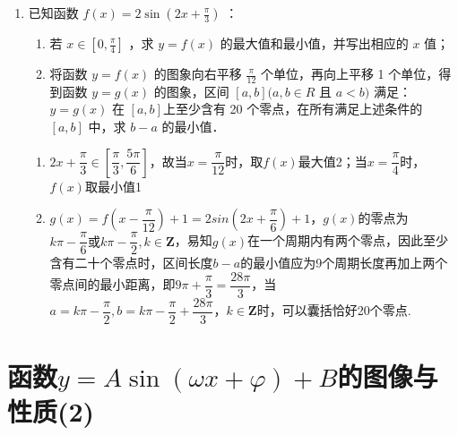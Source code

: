\begin{enumerate}
\item 已知函数 $f(x)=2 \sin \left(2 x+\frac{\pi}{3}\right)$ ：
\begin{enumerate}[(1)]
    \item 若 $x \in\left[0, \frac{\pi}{4}\right]$ ，求 $y=f(x)$ 的最大值和最小值，并写出相应的 $x$ 值；
    \item 将函数 $y=f(x)$ 的图象向右平移 $\frac{\pi}{12}$ 个单位，再向上平移 1 个单位，得到函数 $y=g(x)$ 的图象，区间 $[a, b](a, b \in R$ 且 $a<b)$ 满足：$y=g(x)$ 在 $[a, b]$上至少含有 20 个零点，在所有满足上述条件的 $[a, b]$ 中，求 $b-a$ 的最小值．
\end{enumerate}
\begin{jieda}
    \begin{enumerate}[(1)]
        \item $2x+\dfrac{\pi}{3} \in \left[\dfrac{\pi}{3}, \dfrac{5\pi}{6}\right]$，故当$x=\dfrac{\pi}{12}$时，取$f(x)$最大值2；当$x=\dfrac{\pi}{4}$时，$f(x)$取最小值1
        \item $g(x) = f\left(x - \dfrac{\pi}{12}\right) + 1 = 2sin(2x+\dfrac{\pi}{6}) + 1$，$g(x)$的零点为$k\pi - \dfrac{\pi}{6} \mbox{或} k\pi -\dfrac{\pi}{2}, k \in \mathbf{Z}$，易知$g(x)$在一个周期内有两个零点，因此至少含有二十个零点时，区间长度$b-a$的最小值应为9个周期长度再加上两个零点间的最小距离，即$9\pi + \dfrac{\pi}{3} = \dfrac{28\pi}{3}$，当$a = k\pi -\dfrac{\pi}{2}, b = k\pi -\dfrac{\pi}{2} + \dfrac{28\pi}{3}，k \in \mathbf{Z}$时，可以囊括恰好20个零点.
    \end{enumerate}
\end{jieda}

\end{enumerate}

\section{函数$y=A\sin(\omega{x}+\varphi)+B$的图像与性质(2)}

